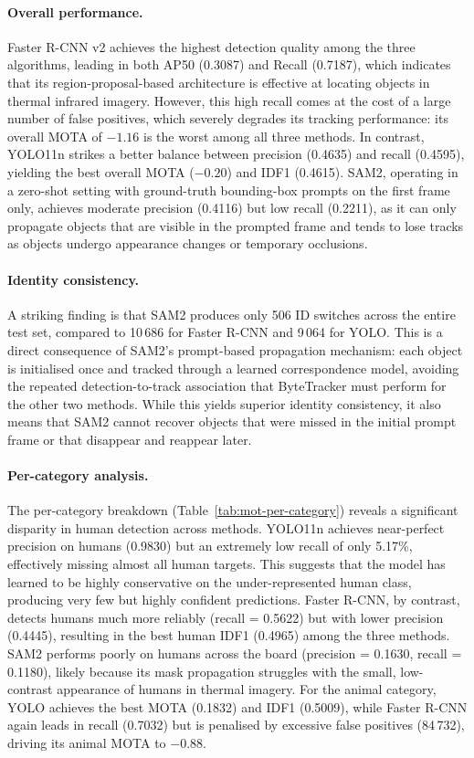 \documentclass[
]{article}
\begin{document}
\paragraph{Overall performance.}
Faster R-CNN v2 achieves the highest detection quality among the three algorithms, leading in both AP50 (0.3087) and Recall (0.7187), which indicates that its region-proposal-based architecture is effective at locating objects in thermal infrared imagery. However, this high recall comes at the cost of a large number of false positives, which severely degrades its tracking performance: its overall MOTA of $-1.16$ is the worst among all three methods. In contrast, YOLO11n strikes a better balance between precision (0.4635) and recall (0.4595), yielding the best overall MOTA ($-0.20$) and IDF1 (0.4615). SAM2, operating in a zero-shot setting with ground-truth bounding-box prompts on the first frame only, achieves moderate precision (0.4116) but low recall (0.2211), as it can only propagate objects that are visible in the prompted frame and tends to lose tracks as objects undergo appearance changes or temporary occlusions.

\paragraph{Identity consistency.}
A striking finding is that SAM2 produces only 506 ID switches across the entire test set, compared to 10\,686 for Faster R-CNN and 9\,064 for YOLO. This is a direct consequence of SAM2's prompt-based propagation mechanism: each object is initialised once and tracked through a learned correspondence model, avoiding the repeated detection-to-track association that ByteTracker must perform for the other two methods. While this yields superior identity consistency, it also means that SAM2 cannot recover objects that were missed in the initial prompt frame or that disappear and reappear later.

\paragraph{Per-category analysis.}
The per-category breakdown (Table~\ref{tab:mot-per-category}) reveals a significant disparity in human detection across methods. YOLO11n achieves near-perfect precision on humans (0.9830) but an extremely low recall of only 5.17\%, effectively missing almost all human targets. This suggests that the model has learned to be highly conservative on the under-represented human class, producing very few but highly confident predictions. Faster R-CNN, by contrast, detects humans much more reliably (recall = 0.5622) but with lower precision (0.4445), resulting in the best human IDF1 (0.4965) among the three methods. SAM2 performs poorly on humans across the board (precision = 0.1630, recall = 0.1180), likely because its mask propagation struggles with the small, low-contrast appearance of humans in thermal imagery. For the animal category, YOLO achieves the best MOTA (0.1832) and IDF1 (0.5009), while Faster R-CNN again leads in recall (0.7032) but is penalised by excessive false positives (84\,732), driving its animal MOTA to $-0.88$.
\end{document}
